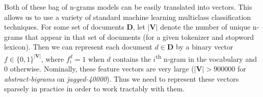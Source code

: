 Both of these bag of n-grams models can be easily translated into vectors. This allows us to use a variety of standard machine learning multiclass classification techniques. For some set of documents $\mathbf{D}$, let $| \mathbf{V} |$ denote the number of unique n-grams that appear in that set of documents (for a given tokenizer and stopword lexicon). Then we can represent each document $ d \in \mathbf{D}$ by a binary vector $f \in \{0,1\}^{| \mathbf{V} |}$, where $f^d_i = 1$ when $d$ contains the $i$\textsuperscript{th} n-gram in the vocabulary and 0 otherwise. Nominally, these feature vectors are very large ($| \mathbf{V} | > 900000$ for \emph{abstract-bigrams} on \emph{jagged-40000}). Thus we need to represent these vectors sparsely in practice in order to work tractably with them.


